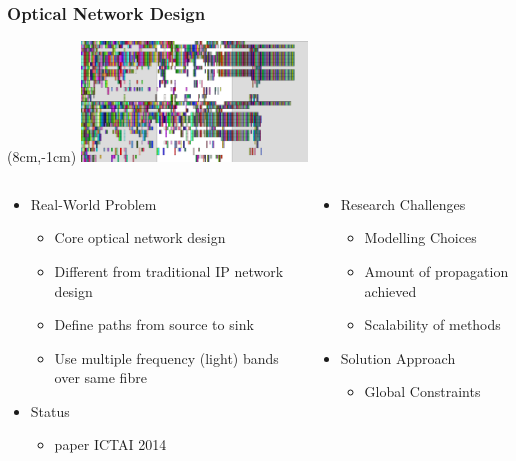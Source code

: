\begin{frame}
\frametitle{Optical Network Design}
\begin{textblock*}{6cm}(8cm,-1cm)
\includegraphics[width=6cm]{images/Ireland18}
\end{textblock*}
\vspace{1cm}
\begin{columns}[b]
\begin{column}{0.5\textwidth}
\begin{itemize}
\item Real-World Problem
\begin{itemize}
\item Core optical network design 
\item Different from traditional IP network design
\item Define paths from source to sink
\item Use multiple frequency (light) bands over same fibre
\end{itemize}
\item Status
\begin{itemize}
\item paper ICTAI 2014
\end{itemize}
\end{itemize}
\end{column}
\begin{column}{0.5\textwidth}
\begin{itemize}
\item Research Challenges
\begin{itemize}
\item Modelling Choices
\item Amount of propagation achieved
\item Scalability of methods
\end{itemize}
\item Solution Approach
\begin{itemize}
\item Global Constraints
\end{itemize}
\end{itemize}
\end{column}
\end{columns}
\end{frame}

